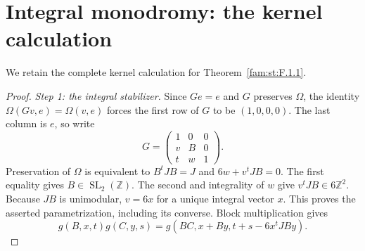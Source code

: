 \section{Integral monodromy: the kernel calculation}\label{app:cdp-monodromy}
We retain the complete kernel calculation for Theorem~\ref{fam:st:F.1.1}.
\begin{proof}
\textit{Step 1: the integral stabilizer.}
Since $Ge=e$ and $G$ preserves $\Omega$, the identity
$\Omega(Gv,e)=\Omega(v,e)$ forces the first row of $G$ to be
$(1,0,0,0)$. The last column is $e$, so write
\[
 G=\begin{pmatrix}1&0&0\\v&B&0\\t&w&1\end{pmatrix}.
\]
Preservation of $\Omega$ is equivalent to
$B^tJB=J$ and $6w+v^tJB=0$. The first equality gives
$B\in\operatorname{SL}_2(\mathbb Z)$. The second and integrality of $w$
give $v^tJB\in6\mathbb Z^2$. Because $JB$ is unimodular,
$v=6x$ for a unique integral vector $x$. This proves the asserted
parametrization, including its converse. Block multiplication gives
\begin{equation}\label{cdp:eq:parabolic-law}
 g(B,x,t)g(C,y,s)=g(BC,x+By,t+s-6x^tJBy).
\end{equation}


\end{proof}
